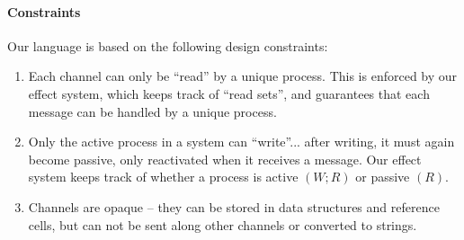 \paragraph{Constraints}
Our language is based on the following design constraints:
\begin{enumerate}
\item Each channel can only be “read” by a unique process. This is enforced by our effect system, which keeps track of “read sets”, and guarantees that each message can be handled by a unique process.
\item Only the active process in a system can “write”... after writing, it must again become passive, only reactivated when it receives a message. Our effect system keeps track of whether a process is active $(W; R)$ or passive $(R)$.
\item Channels are opaque -- they can be stored in data structures and reference cells, but can not be sent along other channels or converted to strings.
\end{enumerate}
